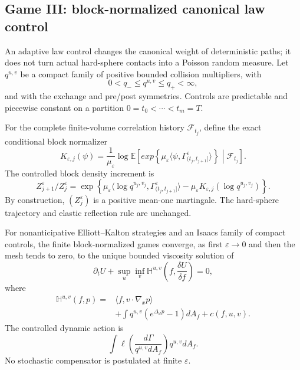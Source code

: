 \subsection{Game III: block-normalized canonical law control}

An adaptive law control changes the canonical weight of deterministic paths;
it does not turn actual hard-sphere contacts into a Poisson random measure.
Let \(q^{u,v}\) be a compact family of positive bounded collision multipliers,
with
\[
 0<q_-\le q^{u,v}\le q_+<\infty,
\]
and with the exchange and pre/post symmetries.  Controls are predictable and
piecewise constant on a partition
\(0=t_0<\cdots<t_m=T\).

For the complete finite-volume correlation history \(\mathcal F_{t_j}\),
define the exact conditional block normalizer
\[
 K_{\varepsilon,j}(\psi)
 =\frac1{\mu_\varepsilon}
 \log\mathbb E\left[
 
 exp\left\{
 \mu_\varepsilon\langle\psi,
 \Gamma_{(t_j,t_{j+1}]}^\varepsilon\rangle
 \right\}\middle|\mathcal F_{t_j}\right].
\]
The controlled block density increment is
\[
 Z_{j+1}^{\varepsilon}/Z_j^{\varepsilon}
 =\exp\left\{
 \mu_\varepsilon
 \langle\log q^{u_j,v_j},
 \Gamma_{(t_j,t_{j+1}]}^\varepsilon\rangle
 -\mu_\varepsilon
 K_{\varepsilon,j}(\log q^{u_j,v_j})
 \right\}.
\]
By construction, \((Z_j^\varepsilon)\) is a positive mean-one martingale.
The hard-sphere trajectory and elastic reflection rule are unchanged.

\begin{theorem}
\label{thm:r3-c1-adaptive}
For nonanticipative Elliott--Kalton strategies and an Isaacs family of compact
controls, the finite block-normalized games converge, as first
\(\varepsilon\to0\) and then the mesh tends to zero, to the unique bounded
viscosity solution of
\[
 \partial_tU+\sup_u\inf_v
 \mathbb H^{u,v}\left(f,\frac{\delta U}{\delta f}\right)=0,
\]
where
\[
 \begin{aligned}
 \mathbb H^{u,v}(f,p)
 ={}&\langle f,v\cdot\nabla_xp\rangle\\
 &+\int q^{u,v}
 \left(e^{\Delta_\omega p}-1\right)dA_f
 +c(f,u,v).
 \end{aligned}
\]
The controlled dynamic action is
\[
 \int
 \ell\left(\frac{d\Gamma}{q^{u,v}dA_f}\right)
 q^{u,v}dA_f.
\]
No stochastic compensator is postulated at finite \(\varepsilon\).
\end{theorem}

